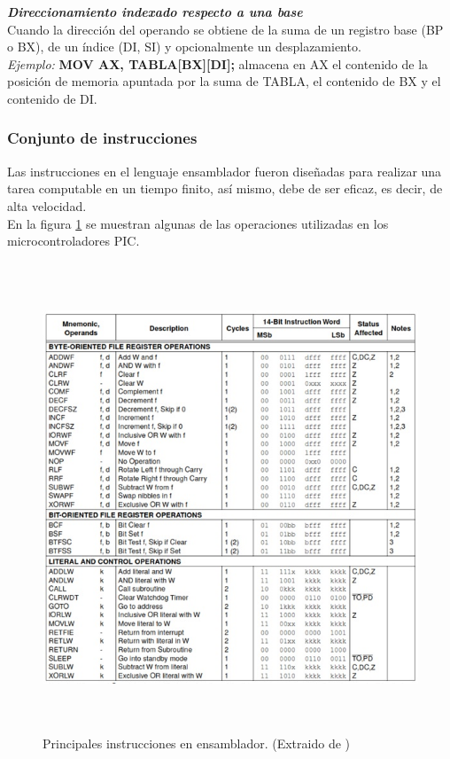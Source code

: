 \documentclass[12pt,a4paper]{article}
\begin{document}
   \textbf{\textit{Direccionamiento indexado respecto a una base}}\\
  Cuando la dirección del operando se obtiene de la suma de un registro base (BP o BX), de un índice (DI, SI) y opcionalmente un desplazamiento. \\
   \textit{Ejemplo:}
   \hspace{1cm} \textbf{MOV AX, TABLA[BX][DI];} almacena en AX el contenido de la posición de memoria apuntada por la suma de TABLA, el contenido de BX y el contenido de DI. \\   
   
   \subsubsection{Conjunto de instrucciones}
   Las instrucciones en el lenguaje ensamblador fueron diseñadas para realizar una tarea computable en un tiempo finito, así mismo, debe de ser eficaz, es decir, de alta velocidad.\\
  En la figura \ref{fig:tablaAssembler} se muestran algunas de las operaciones utilizadas en los microcontroladores PIC.
   
   \begin{figure}[htpb]
    \centering
     \includegraphics[height=14cm]{InstruccionesEnsamblador}
     \caption{Principales instrucciones en ensamblador. (Extraido de \cite{PIC})}
     \label{fig:tablaAssembler}
   \end{figure}
   
\end{document}
